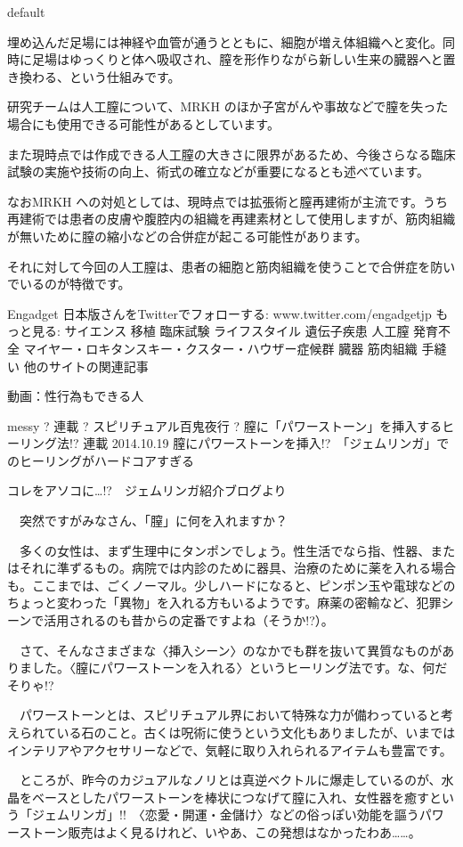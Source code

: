 default

埋め込んだ足場には神経や血管が通うとともに、細胞が増え体組織へと変化。同時に足場はゆっくりと体へ吸収され、膣を形作りながら新しい生来の臓器へと置き換わる、という仕組みです。

研究チームは人工膣について、MRKH のほか子宮がんや事故などで膣を失った場合にも使用できる可能性があるとしています。

また現時点では作成できる人工膣の大きさに限界があるため、今後さらなる臨床試験の実施や技術の向上、術式の確立などが重要になるとも述べています。

なおMRKH への対処としては、現時点では拡張術と膣再建術が主流です。うち再建術では患者の皮膚や腹腔内の組織を再建素材として使用しますが、筋肉組織が無いために膣の縮小などの合併症が起こる可能性があります。

それに対して今回の人工膣は、患者の細胞と筋肉組織を使うことで合併症を防いでいるのが特徴です。


Engadget 日本版さんをTwitterでフォローする: www.twitter.com/engadgetjp
もっと見る:
サイエンス 移植 臨床試験 ライフスタイル 遺伝子疾患 人工膣 発育不全 マイヤー・ロキタンスキー・クスター・ハウザー症候群 臓器 筋肉組織 手縫い
他のサイトの関連記事

動画：性行為もできる人



messy ? 連載 ? スピリチュアル百鬼夜行 ? 膣に「パワーストーン」を挿入するヒーリング法!?
連載
2014.10.19
膣にパワーストーンを挿入!?　「ジェムリンガ」でのヒーリングがハードコアすぎる


コレをアソコに…!?　ジェムリンガ紹介ブログより

　突然ですがみなさん、「膣」に何を入れますか？

　多くの女性は、まず生理中にタンポンでしょう。性生活でなら指、性器、またはそれに準ずるもの。病院では内診のために器具、治療のために薬を入れる場合も。ここまでは、ごくノーマル。少しハードになると、ピンポン玉や電球などのちょっと変わった「異物」を入れる方もいるようです。麻薬の密輸など、犯罪シーンで活用されるのも昔からの定番ですよね（そうか!?）。

　さて、そんなさまざまな〈挿入シーン〉のなかでも群を抜いて異質なものがありました。〈膣にパワーストーンを入れる〉というヒーリング法です。な、何だそりゃ!?

　パワーストーンとは、スピリチュアル界において特殊な力が備わっていると考えられている石のこと。古くは呪術に使うという文化もありましたが、いまではインテリアやアクセサリーなどで、気軽に取り入れられるアイテムも豊富です。

　ところが、昨今のカジュアルなノリとは真逆ベクトルに爆走しているのが、水晶をベースとしたパワーストーンを棒状につなげて膣に入れ、女性器を癒すという「ジェムリンガ」!!　〈恋愛・開運・金儲け〉などの俗っぽい効能を謳うパワーストーン販売はよく見るけれど、いやあ、この発想はなかったわあ……。

